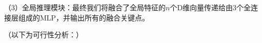 \documentclass[12pt]{article}
\begin{document}
（3）全局推理模块：最终我们将融合了全局特征的$n$个D维向量传递给由3个全连接层组成的MLP，并输出所有的融合关键点。

（以下为可行性分析：）
\end{document}
